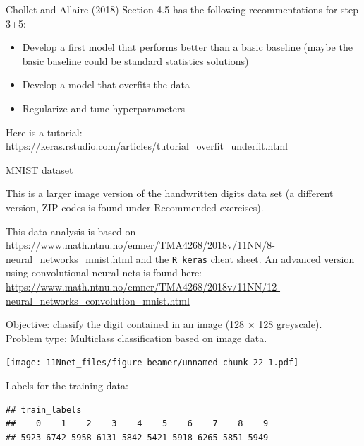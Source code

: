 \documentclass[10pt,ignorenonframetext,]{beamer}
\providecommand{\tightlist}{%
  \setlength{\itemsep}{0pt}\setlength{\parskip}{0pt}}
\begin{document}
\begin{frame}

Chollet and Allaire (2018) Section 4.5 has the following recommentations
for step 3+5:

\begin{itemize}
\tightlist
\item
  Develop a first model that performs better than a basic baseline
  (maybe the basic baseline could be standard statistics solutions)
\item
  Develop a model that overfits the data
\item
  Regularize and tune hyperparameters
\end{itemize}

Here is a tutorial:
\url{https://keras.rstudio.com/articles/tutorial_overfit_underfit.html}

\end{frame}

\begin{frame}[fragile]

\begin{block}{MNIST dataset}

This is a larger image version of the handwritten digits data set (a
different version, ZIP-codes is found under Recommended exercises).

This data analysis is based on
\url{https://www.math.ntnu.no/emner/TMA4268/2018v/11NN/8-neural_networks_mnist.html}
and the \texttt{R\ keras} cheat sheet. An advanced version using
convolutional neural nets is found here:
\url{https://www.math.ntnu.no/emner/TMA4268/2018v/11NN/12-neural_networks_convolution_mnist.html}

\end{block}

\end{frame}

\begin{frame}

Objective: classify the digit contained in an image (128 \(\times\) 128
greyscale). Problem type: Multiclass classification based on image data.

\texttt{[image: 11Nnet\_files/figure-beamer/unnamed-chunk-22-1.pdf]}

\end{frame}

\begin{frame}[fragile]

Labels for the training data:

\begin{verbatim}
## train_labels
##    0    1    2    3    4    5    6    7    8    9 
## 5923 6742 5958 6131 5842 5421 5918 6265 5851 5949
\end{verbatim}

\end{frame}
\end{document}
